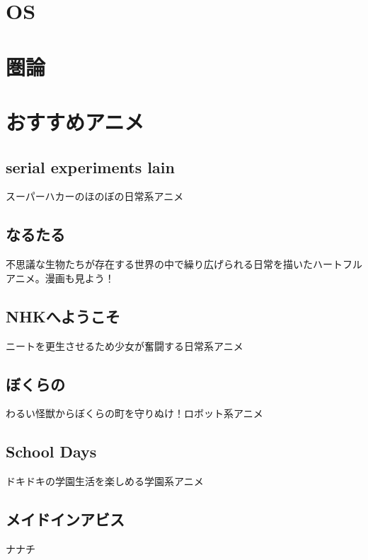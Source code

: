 \documentclass{jarticle}
\begin{document}
\section{OS}
\clearpage
\section{圏論}
\clearpage
\section{おすすめアニメ}
   \subsection{serial experiments lain}
      スーパーハカーのほのぼの日常系アニメ
   \subsection{なるたる}
      不思議な生物たちが存在する世界の中で繰り広げられる日常を描いたハートフルアニメ。漫画も見よう！
   \subsection{NHKへようこそ}
      ニートを更生させるため少女が奮闘する日常系アニメ
   \subsection{ぼくらの}
      わるい怪獣からぼくらの町を守りぬけ！ロボット系アニメ
   \subsection{School Days}
      ドキドキの学園生活を楽しめる学園系アニメ
   \subsection{メイドインアビス}
      ナナチ
\end{document}
